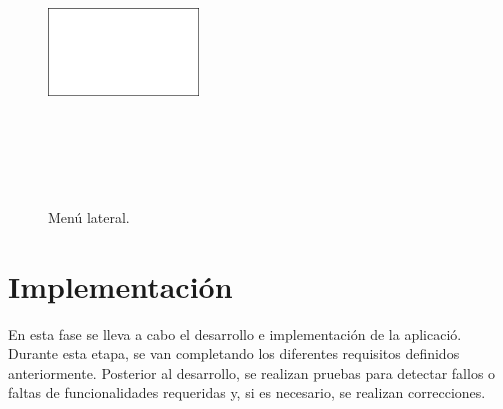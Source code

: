 \documentclass[a4paper, 12pt]{article}
\begin{document}
\begin{figure}[H]
   	\begin{minipage}{0.48\textwidth}
		\begin{center}
			{\includegraphics[height=8cm, width=4cm]{White.png}\par}
			\caption{Menú lateral.}
			\medskip
		\end{center}  
	\end{minipage}\hfill
\end{figure}

\newpage
\section{Implementación}

En esta fase se lleva a cabo el desarrollo e implementación de la aplicació. Durante esta etapa, se van completando los diferentes requisitos definidos anteriormente.  Posterior al desarrollo, se realizan pruebas para detectar fallos o faltas de funcionalidades requeridas y, si es necesario, se realizan correcciones.
\end{document}
